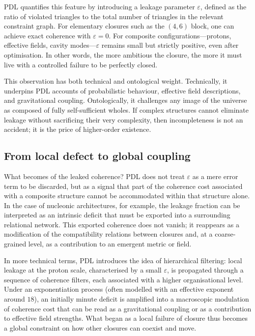 \documentclass[11pt,a4paper]{article}
\theoremstyle{definition}
\begin{document}
PDL quantifies this feature by introducing a leakage parameter \(\varepsilon\), defined as the ratio of violated triangles to the total number of triangles in the relevant constraint graph.\cite{Laubscher_Leakage_Probability_2024} For elementary closures such as the \((4,6)\) block, one can achieve exact coherence with \(\varepsilon = 0\).\cite{Laubscher_MinimalClosures_46_2024} For composite configurations---protons, effective fields, cavity modes---\(\varepsilon\) remains small but strictly positive, even after optimisation.\cite{Laubscher_ProtonArch_v2_2024,Laubscher_EffectiveFields_2024,Laubscher_CavityModes_PDL_2024} In other words, the more ambitious the closure, the more it must live with a controlled failure to be perfectly closed.

This observation has both technical and ontological weight. Technically, it underpins PDL accounts of probabilistic behaviour, effective field descriptions, and gravitational coupling.\cite{Laubscher_Leakage_Probability_2024,Laubscher_EffectiveFields_2024,Laubscher_UniversalCoherenceLeakage_2024} Ontologically, it challenges any image of the universe as composed of fully self-sufficient wholes. If complex structures cannot eliminate leakage without sacrificing their very complexity, then incompleteness is not an accident; it is the price of higher-order existence.

\subsection{From local defect to global coupling}

What becomes of the leaked coherence? PDL does not treat \(\varepsilon\) as a mere error term to be discarded, but as a signal that part of the coherence cost associated with a composite structure cannot be accommodated within that structure alone.\cite{Laubscher_Leakage_Probability_2024,Laubscher_UniversalCoherenceLeakage_2024} In the case of nucleonic architectures, for example, the leakage fraction can be interpreted as an intrinsic deficit that must be exported into a surrounding relational network. This exported coherence does not vanish; it reappears as a modification of the compatibility relations between closures and, at a coarse-grained level, as a contribution to an emergent metric or field.

In more technical terms, PDL introduces the idea of hierarchical filtering: local leakage at the proton scale, characterised by a small \(\varepsilon\), is propagated through a sequence of coherence filters, each associated with a higher organisational level.\cite{Laubscher_Exponent18_v2_2024,Laubscher_UniversalCoherenceLeakage_2024} Under an exponentiation process (often modelled with an effective exponent around \(18\)), an initially minute deficit is amplified into a macroscopic modulation of coherence cost that can be read as a gravitational coupling or as a contribution to effective field strengths.\cite{Laubscher_Exponent18_v2_2024,Laubscher_EffectiveFields_2024} What began as a local failure of closure thus becomes a global constraint on how other closures can coexist and move.
\end{document}
